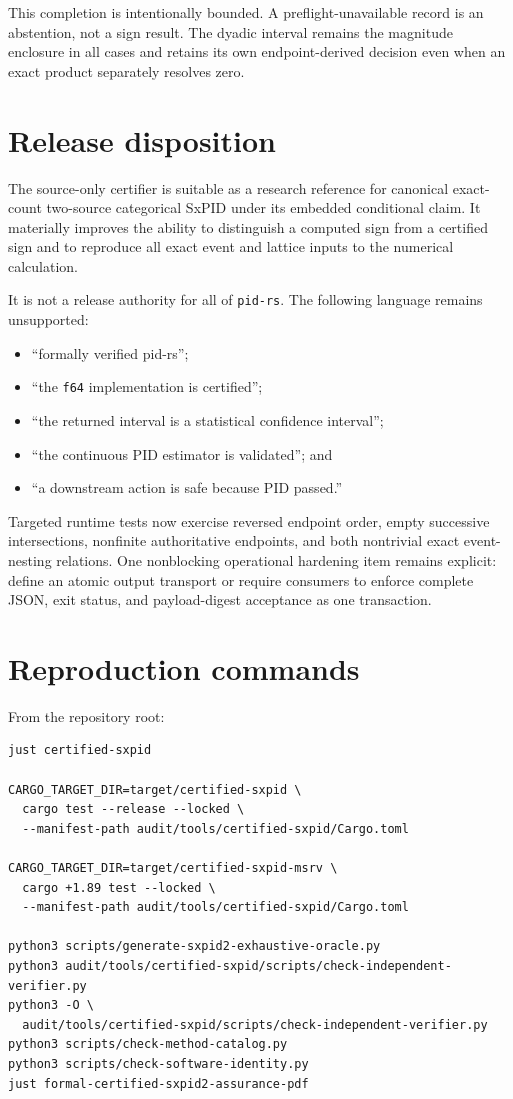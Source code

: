 \documentclass[11pt]{article}
\theoremstyle{definition}
\begin{document}
This completion is intentionally bounded.  A preflight-unavailable record is an abstention, not a
sign result.  The dyadic interval remains the magnitude enclosure in all cases and retains its own
endpoint-derived decision even when an exact product separately resolves zero.

\section{Release disposition}

The source-only certifier is suitable as a research reference for canonical exact-count
two-source categorical SxPID under its embedded conditional claim.  It materially improves the
ability to distinguish a computed sign from a certified sign and to reproduce all exact event and
lattice inputs to the numerical calculation.

It is not a release authority for all of \texttt{pid-rs}.  The following language remains
unsupported:
\begin{itemize}[leftmargin=*]
  \item ``formally verified pid-rs'';
  \item ``the \texttt{f64} implementation is certified'';
  \item ``the returned interval is a statistical confidence interval'';
  \item ``the continuous PID estimator is validated''; and
  \item ``a downstream action is safe because PID passed.''
\end{itemize}

Targeted runtime tests now exercise reversed endpoint order, empty successive intersections,
nonfinite authoritative endpoints, and both nontrivial exact event-nesting relations.  One
nonblocking operational hardening item remains explicit: define an atomic output transport or
require consumers to enforce complete JSON, exit status, and payload-digest acceptance as one
transaction.

\section{Reproduction commands}

From the repository root:
\begin{lstlisting}
just certified-sxpid

CARGO_TARGET_DIR=target/certified-sxpid \
  cargo test --release --locked \
  --manifest-path audit/tools/certified-sxpid/Cargo.toml

CARGO_TARGET_DIR=target/certified-sxpid-msrv \
  cargo +1.89 test --locked \
  --manifest-path audit/tools/certified-sxpid/Cargo.toml

python3 scripts/generate-sxpid2-exhaustive-oracle.py
python3 audit/tools/certified-sxpid/scripts/check-independent-verifier.py
python3 -O \
  audit/tools/certified-sxpid/scripts/check-independent-verifier.py
python3 scripts/check-method-catalog.py
python3 scripts/check-software-identity.py
just formal-certified-sxpid2-assurance-pdf
\end{lstlisting}
\end{document}
